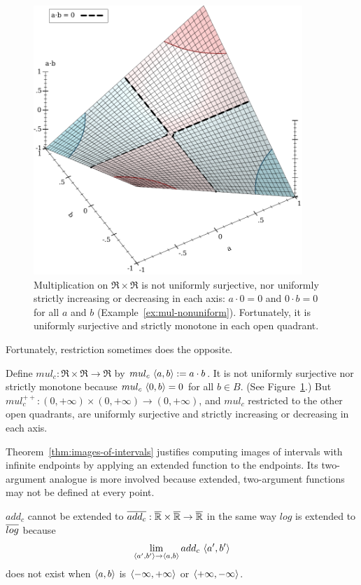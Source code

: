 \begin{figure}[!tb]
\centering
\includegraphics[width=4in]{figures/mul-nonuniform-properties}
\caption[ ]{Multiplication on $\Re \times \Re$ is not uniformly surjective, nor uniformly strictly increasing or decreasing in each axis: $a \cdot 0 = 0$ and $0 \cdot b = 0$ for all $a$ and $b$ (Example~\ref{ex:mul-nonuniform}).
Fortunately, it is uniformly surjective and strictly monotone in each open quadrant.}
\label{fig:mul-nonuniform}
\end{figure}

Fortunately, restriction sometimes does the opposite.

\begin{example}
\label{ex:mul-nonuniform}
Define $mul_c : \Re \times \Re \to \Re$ by $mul_c~\langle{a,b}\rangle := a \cdot b$.
It is not uniformly surjective nor strictly monotone because $mul_c~\langle{0,b}\rangle = 0$ for all $b \in B$.
(See Figure~\ref{fig:mul-nonuniform}.)
But $mul_c^{++} : (0,+\infty) \times (0,+\infty) \to (0,+\infty)$, and $mul_c$ restricted to the other open quadrants, are uniformly surjective and strictly increasing or decreasing in each axis.
\exampleqed
\end{example}

Theorem~\ref{thm:images-of-intervals} justifies computing images of intervals with infinite endpoints by applying an extended function to the endpoints.
Its two-argument analogue is more involved because extended, two-argument functions may not be defined at every point.

\begin{example}
$add_c$ cannot be extended to $\cl{add_c} : \cl{\Re} \times \cl{\Re} \to \cl{\Re}$ in the same way $log$ is extended to $\cl{log}$ because
\begin{equation}
	\lim_{\langle{a',b'}\rangle \to \langle{a,b}\rangle} add_c~\langle{a',b'}\rangle
\end{equation}
does not exist when $\langle{a,b}\rangle$ is $\langle{-\infty,+\infty}\rangle$ or $\langle{+\infty,-\infty}\rangle$.
\exampleqed
\end{example}

